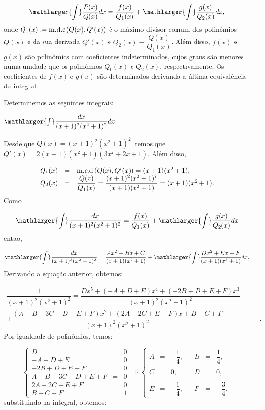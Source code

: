 \cleardoublepage\documentclass[../main.tex]{subfiles}
\begin{document}
\[ \mathlarger{\int}\dfrac{P(x)}{Q(x)}dx= \dfrac{f(x)}{Q_1(x)} + \mathlarger{\int}\dfrac{g(x)}{Q_2(x)}dx, \]
onde \(Q_1(x):={\rm m.d.c}\left(Q(x), Q'(x)\right) \) é o máximo divisor comum dos polinômios \(Q(x)\) e da sua derivada \(Q'(x)\) e \(Q_2(x)=\dfrac{Q(x)}{Q_1(x)}\). Além disso, \(f(x)\) e \(g(x)\) são polinômios com coeficientes indeterminados, cujos graus são menores numa unidade que os polinômios \(Q_1(x)\) e \(Q_2(x)\), respectivamente. Os coeficientes de \(f(x)\) e \(g(x)\) são determinados derivando a última equivalência da integral.

\begin{ex}
Determinemos as seguintes integrais:
\begin{compactenum}[a)]
\item \(\mathlarger{\int}\dfrac{dx}{(x+1)^2(x^2+1)^2} dx\)\\

\begin{solution}
Desde que \(Q(x)=(x+1)^2(x^2+1)^2\), temos que \(Q'(x)=2(x+1)(x^2+1)(3x^2+2x+1)\). Além disso,

\[ \begin{array}{rcl} Q_1(x) &=& {\rm m.c.d}\left(Q(x), Q'(x)\right) = (x+1)(x^2+1);\\ Q_2(x) &=& \dfrac{Q(x)}{Q_1(x)}= \dfrac{(x+1)^2(x^2+1)^2}{(x+1)(x^2+1)}=(x+1)(x^2+1). \end{array} \]
Como

\[ \mathlarger{\int}\dfrac{dx}{(x+1)^2(x^2+1)^2}= \dfrac{f(x)}{Q_1(x)} + \mathlarger{\int}\dfrac{g(x)}{Q_2(x)}dx \]
então,

\[ \mathlarger{\int}\dfrac{dx}{(x+1)^2(x^2+1)^2}= \dfrac{Ax^2+Bx+C}{(x+1)(x^2+1)} + \mathlarger{\int}\dfrac{Dx^2+Ex+F}{(x+1)(x^2+1)}dx. \]
Derivando a equação anterior, obtemos:

\[ \begin{array}{rcl} \dfrac{1}{(x+1)^2(x^2+1)^2} = \dfrac{Dx^5+(-A+D+E)x^4+(-2B+D+E+F)x^3}{(x+1)^2(x^2+1)^2}+\\ + \dfrac{(A-B-3C+ D+E+F)x^2 +(2A-2C+E+F)x+B-C+F}{(x+1)^2(x^2+1)^2}&&. \end{array} \]
Por igualdade de polinômios, temos:

\[ \left\{ \begin{array}{rcr} D &=&0\\ -A+D+E &=&0\\ -2B+D+E+F&=&0\\ A-B-3C+ D+E+F&=&0\\ 2A-2C+E+F&=&0\\ B-C+F&=&1 \end{array} \right. \Rightarrow \left\{ \begin{array}{ccrcccr} A&=&-\dfrac{1}{4},& & B&=&\dfrac{1}{4},\\ &&&&&\\ C&=&0, & & D&=&0,\\ &&&&&\\ E&=&-\dfrac{1}{4},& & F&=&-\dfrac{3}{4}, \end{array} \right. \]
substituindo na integral, obtemos:


\end{solution}
\end{compactenum}
\end{ex}
\end{document}

